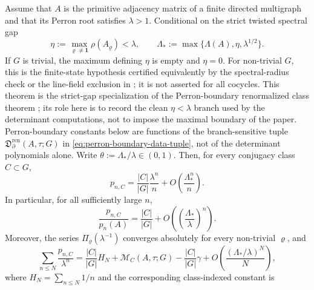 \begin{theorem}
  \label{thm:class-mertens-explicit}
  Assume that \(A\) is the primitive adjacency matrix of a finite directed
  multigraph and that its Perron root satisfies \(\lambda>1\).  Conditional on
  the strict twisted spectral gap
  \[
    \eta:=\max_{\varrho\neq\mathbf 1}\rho(A_\varrho)<\lambda,
    \qquad
    \Lambda_*:=\max\{\Lambda(A),\eta,\lambda^{1/2}\}.
  \]
  If \(G\) is trivial, the maximum defining \(\eta\) is empty and
  \(\eta=0\). For non-trivial \(G\), this is the finite-state hypothesis
  certified equivalently by the spectral-radius check or the line-field
  exclusion in ; it is not asserted
  for all cocycles.  This theorem is the strict-gap specialization of the
  Perron-boundary renormalized class theorem
  ; its role
  here is to record the clean \(\eta<\lambda\) branch used by the determinant
  computations, not to impose the maximal boundary of the paper.  Perron-boundary
  constants below are functions of the
  branch-sensitive tuple \(\mathfrak D_{\partial}^{\mathrm{ren}}(A,\tau;G)\) in
  \eqref{eq:perron-boundary-data-tuple}, not of the determinant polynomials
  alone.
  Write \(\theta:=\Lambda_*/\lambda\in(0,1)\).
  Then, for every conjugacy class \(C\subset G\),
  \begin{equation}\label{eq:class-primitive-asymptotic}
    p_{n,C}
    =
    \frac{|C|}{|G|}\frac{\lambda^n}{n}
    +O\!\left(\frac{\Lambda_*^n}{n}\right).
  \end{equation}
  In particular, for all sufficiently large \(n\),
  \begin{equation}\label{eq:class-chebotarev-density}
    \frac{p_{n,C}}{p_n(A)}
    =
    \frac{|C|}{|G|}
    +O\!\left(\left(\frac{\Lambda_*}{\lambda}\right)^n\right).
  \end{equation}
  Moreover, the series \(\Pi_\varrho(\lambda^{-1})\) converges
  absolutely for every non-trivial \(\varrho\), and
  \begin{equation}\label{eq:class-mertens-harmonic}
    \sum_{n\le N}\frac{p_{n,C}}{\lambda^n}
    =
    \frac{|C|}{|G|}H_N
    +\mathcal M_C(A,\tau;G)-\frac{|C|}{|G|}\gamma
    +O\!\left(\frac{(\Lambda_*/\lambda)^N}{N}\right),
  \end{equation}
  where \(H_N=\sum_{n\le N}1/n\) and the corresponding class-indexed
  constant is
  \begin{equation}\label{eq:class-mertens-constant}

\end{equation}
\end{theorem}
